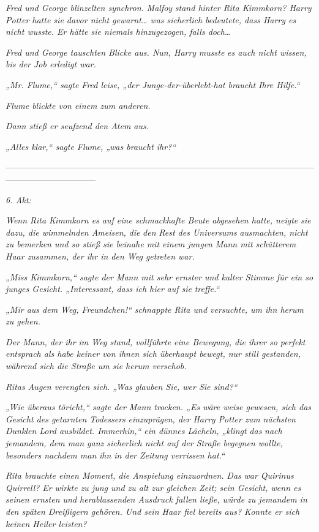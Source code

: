{\emph{Fred und George blinzelten synchron.} \emph{\emph{Malfoy}} \emph{stand hinter Rita Kimmkorn? Harry Potter hatte sie davor nicht gewarnt… was sicherlich bedeutete, dass Harry es nicht wusste. Er hätte sie niemals hinzugezogen, falls doch…}

\emph{Fred und George tauschten Blicke aus. Nun, Harry} \emph{\emph{musste}} \emph{es auch nicht wissen, bis der Job erledigt war.}

\emph{„Mr. Flume,“ sagte Fred leise, „der Junge-der-überlebt-hat braucht Ihre Hilfe.“}

\emph{Flume blickte von einem zum anderen.}

\emph{Dann stieß er seufzend den Atem aus.}

\emph{„Alles klar,“ sagte Flume, „was braucht ihr?“}

--------------------------------------------------------------------------------------------------------------------------------------------

\hfill\break \emph{6. Akt:}

\emph{Wenn Rita Kimmkorn es auf eine schmackhafte Beute abgesehen hatte, neigte sie dazu, die wimmelnden Ameisen,} \emph{die} \emph{den} \emph{Rest des Universums} \emph{ausmachten, nicht zu bemerken und so stieß sie beinahe mit einem jungen} \emph{Mann mit schütterem Haar zusammen, der ihr in den Weg getreten war.}

\emph{„Miss Kimmkorn,“ sagte der Mann mit sehr ernster und kalter Stimme für ein so junges Gesicht. „Interessant, dass ich hier} \emph{auf sie} \emph{treffe.“}

\emph{„Mir aus dem Weg, Freundchen!“ schnappte Rita und versuchte, um ihn herum zu gehen.}

\emph{Der Mann, der ihr im Weg stand, vollführte eine Bewegung, die ihrer so perfekt entsprach als habe keiner von ihnen sich überhaupt bewegt, nur still gestanden, während sich die Straße um sie herum verschob.}

\emph{Ritas Augen verengten sich. „Was glauben Sie, wer Sie sind?“}

\emph{„Wie überaus töricht,“ sagte der Mann trocken. „Es wäre weise gewesen, sich das Gesicht des getarnten Todessers} \emph{einzuprägen, der Harry Potter zum nächsten Dunklen Lord ausbildet. Immerhin,“ ein dünnes Lächeln, „klingt} \emph{\emph{das}} \emph{nach jemandem, dem man ganz sicherlich nicht auf der Straße begegnen wollte, besonders nachdem man} \emph{ihn in der Zeitung verrissen hat.“}

\emph{Rita brauchte einen Moment, die Anspielung einzuordnen.} \emph{\emph{Das}} \emph{war Quirinus Quirrell?} \emph{Er wirkte zu jung und zu alt zur gleichen Zeit; sein Gesicht, wenn es seinen ernsten und herablassenden Ausdruck fallen ließe, würde zu jemandem in den späten Dreißigern gehören. Und sein Haar fiel bereits aus? Konnte er sich keinen Heiler leisten?}

}
